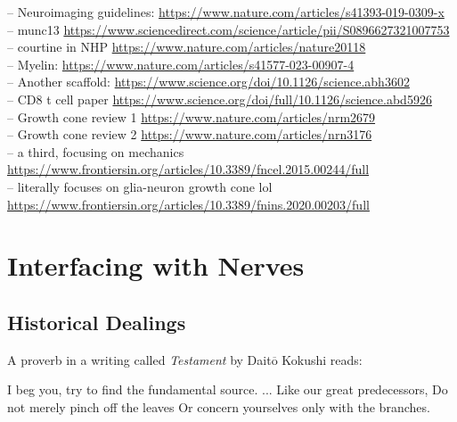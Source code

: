 \documentclass[12pt]{report}
\begin{document}
-- Neuroimaging guidelines: \url{https://www.nature.com/articles/s41393-019-0309-x}\\
-- munc13 \url{https://www.sciencedirect.com/science/article/pii/S0896627321007753}\\
-- courtine in NHP \url{https://www.nature.com/articles/nature20118}\\
-- Myelin: \url{https://www.nature.com/articles/s41577-023-00907-4} \\
-- Another scaffold: \url{https://www.science.org/doi/10.1126/science.abh3602}\\
-- CD8 t cell paper \url{https://www.science.org/doi/full/10.1126/science.abd5926}\\
-- Growth cone review 1 \url{https://www.nature.com/articles/nrm2679} \\
-- Growth cone review 2 \url{https://www.nature.com/articles/nrn3176} \\
-- a third, focusing on mechanics \url{https://www.frontiersin.org/articles/10.3389/fncel.2015.00244/full} \\
-- literally focuses on glia-neuron growth cone lol \url{https://www.frontiersin.org/articles/10.3389/fnins.2020.00203/full} \\

\chapter{Interfacing with Nerves}


\section{Historical Dealings}

\label{sec:HistoricalDealings}

A proverb in a writing called \textit{Testament} by Dait$\overline{\mathrm{o}}$ Kokushi reads:\newline

\hspace*{1cm} I beg you, try to find the fundamental source.\newline
\hspace*{1cm} ...\newline
\hspace*{1cm} Like our great predecessors,\newline 
\hspace*{1cm} Do not merely pinch off the leaves\newline
\hspace*{1cm} Or concern yourselves only with the branches.\newline 
\end{document}
